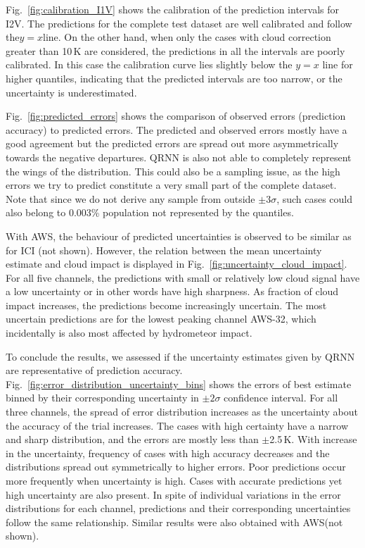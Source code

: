\documentclass[amt, manuscript]{copernicus}
\begin{document}
Fig.~\ref{fig:calibration_I1V} shows the calibration of the prediction intervals for I2V. The predictions for the complete test dataset are well calibrated and follow the$y =x$line. On the other hand, when only the cases with  cloud correction greater than 10\,K are considered, the predictions in all the intervals are poorly calibrated. In this case the calibration curve lies slightly below the $y=x$ line for higher quantiles, indicating that the predicted intervals are too narrow, or the uncertainty is underestimated. 

Fig.~\ref{fig:predicted_errors} shows the comparison of observed errors (prediction accuracy) to predicted errors. The predicted and observed errors mostly have a good agreement but the predicted errors are spread out more asymmetrically towards the negative departures. QRNN is also not able to completely represent the wings of the distribution. This could also be a sampling issue, as the high errors we try to predict constitute a very small part of the complete dataset. Note that since we do not derive any sample from outside $\pm3\sigma$, such cases could also belong to 0.003\% population not represented by the quantiles.   

With AWS, the behaviour of predicted uncertainties is observed to be similar as for ICI (not shown). However, the relation between the mean uncertainty estimate and cloud impact is displayed in Fig.~\ref{fig:uncertainty_cloud_impact}. For all five channels, the predictions with small or relatively low cloud signal have a low uncertainty or in other words have high sharpness. As fraction of cloud impact increases, the predictions become increasingly uncertain. The most uncertain predictions are for the lowest peaking channel AWS-32, which incidentally is also most affected by  hydrometeor impact.  

To conclude the results, we assessed if the uncertainty estimates given by QRNN are representative of prediction accuracy. Fig.~\ref{fig:error_distribution_uncertainty_bins} shows the errors of best estimate binned by their corresponding uncertainty in $\pm2\sigma$  confidence interval. For all three channels, the spread of error distribution increases as the uncertainty about the accuracy of the trial increases. The cases with high certainty have a narrow and sharp distribution, and the errors are mostly less than $\pm$2.5\,K. With increase in the uncertainty, frequency of cases with high accuracy decreases and the distributions spread out symmetrically to higher errors. Poor predictions occur more frequently when uncertainty is high. Cases with accurate predictions yet high uncertainty are also present. In spite of individual variations in the error distributions for each channel, predictions and their corresponding uncertainties follow the same relationship. Similar results were also obtained with AWS(not shown). 
\end{document}
